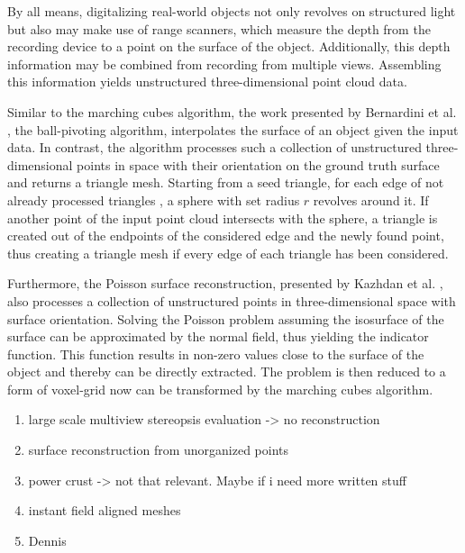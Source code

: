 By all means, digitalizing real-world objects not only revolves on structured light but also may make use of range scanners, which measure the depth from the recording device to a point on the surface of the object. Additionally, this depth information may be combined from recording from multiple views. Assembling this information yields unstructured three-dimensional point cloud data. 

Similar to the marching cubes algorithm, the work presented by 
  Bernardini et al. \cite{817351}, the ball-pivoting algorithm, 
  interpolates the surface of an object given the input data.
  In contrast, the algorithm processes such a collection of unstructured 
  three-dimensional points in space with their orientation on the
  ground truth surface and returns a triangle mesh. Starting from
   a seed triangle, for each edge of not already processed triangles
   , a sphere with set radius $r$ revolves around it. If another point
    of the input point cloud intersects with the sphere, a triangle is 
    created out of the endpoints of the considered edge and the newly 
    found point, thus creating a triangle mesh if every edge of each 
    triangle has been considered. 
  

    Furthermore, the Poisson surface reconstruction, 
    presented by Kazhdan et al. \cite{Kazhdan:2006:PSR:1281957.1281965}, also processes a
     collection of unstructured points in three-dimensional
      space with surface orientation. Solving the Poisson problem 
      \cite{Genovese2006} assuming the isosurface of the surface can be 
      approximated by the normal field, thus yielding the
       indicator function. This function results in non-zero
        values close to the surface of the object and thereby 
        can be directly extracted. The problem is then reduced to a 
        form of voxel-grid now can be transformed by the marching
         cubes algorithm.

    
    
  
  
\begin{enumerate}
  \item large scale multiview stereopsis evaluation -> no reconstruction
  \item surface reconstruction from unorganized points
  \item power crust -> not that relevant. Maybe if i need more written stuff
  \item instant field aligned meshes
  \item Dennis \cite{bukenberger2018hierarchical}
\end{enumerate}


